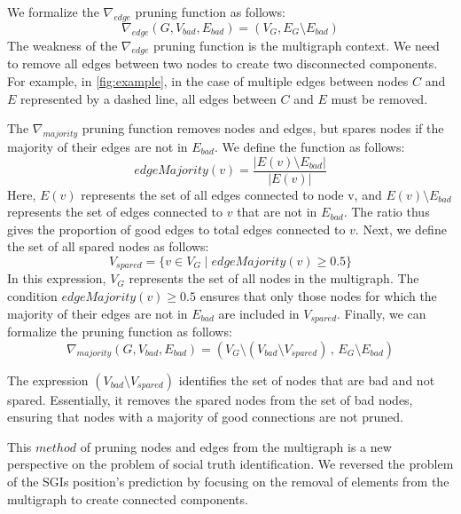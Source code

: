 \documentclass{llncs}
\begin{document}
We formalize the \(\nabla_{edge}\) pruning function as follows:
\begin{equation}
\nabla_{edge}(G, V_{bad}, E_{bad}) = (V_G, E_G \setminus E_{bad})
\end{equation}
The weakness of the \(\nabla_{edge}\) pruning function is the multigraph context.
We need to remove all edges between two nodes to create two disconnected components.
For example, in \autoref{fig:example}, in the case of multiple edges between nodes \(C\) and \(E\) represented by a dashed line, all edges between \(C\) and \(E\) must be removed.


The \(\nabla_{majority}\) pruning function removes nodes and edges, but spares nodes if the majority of their edges are not in \(E_{bad}\).
We define the function as follows:
\begin{equation}
edgeMajority(v) = \frac{|E(v) \setminus E_{bad}|}{|E(v)|}
\end{equation}
Here, \(E(v)\) represents the set of all edges connected to node v, and \(E(v) \setminus E_{bad}\) represents the set of edges connected to \(v\) that are not in \(E_{bad}\).
The ratio thus gives the proportion of good edges to total edges connected to \(v\).
Next, we define the set of all spared nodes as follows:
\begin{equation}
V_{spared} = \{v \in V_G \;|\; edgeMajority(v) \geq 0.5\}
\end{equation}
In this expression, \(V_G\) represents the set of all nodes in the multigraph.
The condition \(edgeMajority(v) \geq 0.5\) ensures that only those nodes for which the majority of their edges are not in \(E_{bad}\) are included in \(V_{spared}\).
Finally, we can formalize the pruning function as follows:
\begin{equation}
\nabla_{majority}(G, V_{bad}, E_{bad}) = (V_G \setminus (V_{bad} \setminus V_{spared})\,,\, E_G \setminus E_{bad})
\end{equation}

The expression \((V_{bad} \setminus V_{spared})\) identifies the set of nodes that are bad and not spared.
Essentially, it removes the spared nodes from the set of bad nodes, ensuring that nodes with a majority of good connections are not pruned.

This \(method\) of pruning nodes and edges from the multigraph is a new perspective on the problem of social truth identification.
We reversed the problem of the SGIs position's prediction by focusing on the removal of elements from the multigraph to create connected components.
\end{document}
